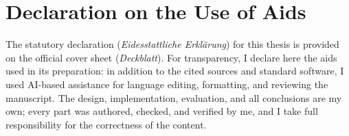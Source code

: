 % 
% 
% 

\chapter*{Declaration on the Use of Aids}
\thispagestyle{empty}

The statutory declaration (\textit{Eidesstattliche Erklärung}) for this thesis is provided on the official cover sheet (\textit{Deckblatt}). For transparency, I declare here the aids used in its preparation: in addition to the cited sources and standard software, I used AI-based assistance for language editing, formatting, and reviewing the manuscript. The design, implementation, evaluation, and all conclusions are my own; every part was authored, checked, and verified by me, and I take full responsibility for the correctness of the content.
